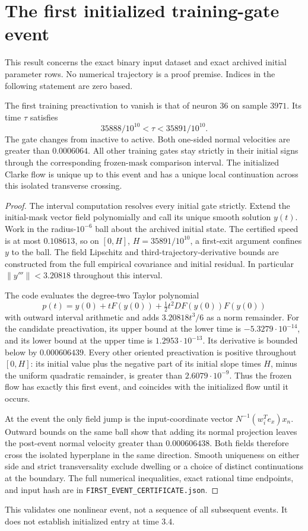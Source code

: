 \section{The first initialized training-gate event}
This result concerns the exact binary input dataset and exact archived
initial parameter rows. No numerical trajectory is a proof premise.
Indices in the following statement are zero based.

\begin{proposition}
The first training preactivation to vanish is that of neuron $36$ on
sample $3971$. Its time $\tau$ satisfies
\[
 35888/10^{10}<\tau<35891/10^{10}.
\]
The gate changes from inactive to active. Both one-sided normal velocities
are greater than $0.0006064$. All other training gates stay strictly in
their initial signs through the corresponding frozen-mask comparison interval.
The initialized Clarke flow is unique up to this event and has a unique
local continuation across this isolated transverse crossing.
\end{proposition}
\begin{proof}
The interval computation resolves every initial gate strictly. Extend the
initial-mask vector field polynomially and call its unique smooth solution
$y(t)$. Work in the radius-$10^{-6}$ ball about the archived initial state.
The certified speed is at most $0.108613$, so on
$[0,H]$, $H=35891/10^{10}$, a first-exit argument confines $y$ to the ball.
The field Lipschitz and third-trajectory-derivative bounds are constructed
from the full empirical covariance and initial residual. In particular
$\|y'''\|<3.20818$ throughout this interval.

The code evaluates the degree-two Taylor polynomial
\[
 p(t)=y(0)+tF(y(0))+\tfrac12t^2DF(y(0))F(y(0))
\]
with outward interval arithmetic and adds $3.20818t^3/6$ as a norm
remainder. For the candidate preactivation, its upper bound at the lower
time is $-5.3279\cdot10^{-14}$, and its lower bound at the upper time is
$1.2953\cdot10^{-13}$. Its derivative is bounded below by $0.000606439$.
Every other oriented preactivation is positive throughout $[0,H]$:
its initial value plus the negative part of its initial slope times $H$,
minus the uniform quadratic remainder, is greater than
$2.6079\cdot10^{-9}$. Thus the frozen flow has exactly this first event,
and coincides with the initialized flow until it occurs.

At the event the only field jump is the input-coordinate vector
$N^{-1}(w_i^Te_x)x_n$. Outward bounds on the same ball show that adding
its normal projection leaves the post-event normal velocity greater than
$0.000606438$. Both fields therefore cross the isolated hyperplane in the
same direction. Smooth uniqueness on either side and strict transversality
exclude dwelling or a choice of distinct continuations at the boundary.
The full numerical inequalities, exact rational time endpoints, and input
hash are in \texttt{FIRST\_EVENT\_CERTIFICATE.json}.
\end{proof}
This validates one nonlinear event, not a sequence of all subsequent events.
It does not establish initialized entry at time $3.4$.
